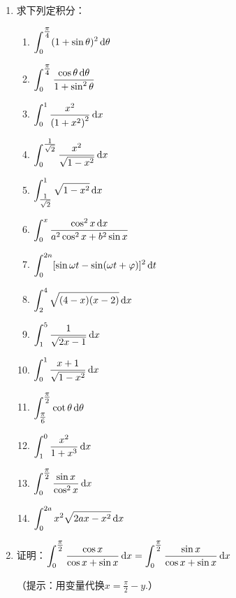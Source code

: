 \begin{ex}
\begin{enumerate}
    \item 求下列定积分：
\begin{multicols}{2}
\begin{enumerate}
    \item $\displaystyle\int_{0}^{\tfrac{\pi}{4}}(1+\sin \theta)^{2} \,{\rm d} \theta $ 
    \item $\displaystyle\int_{0}^{\tfrac{\pi}{4}} \dfrac{\cos \theta \,{\rm d} \theta}{1+\sin ^{2} \theta}$
    \item $\displaystyle\int_{0}^{1} \dfrac{x^{2}}{\left(1+x^{2}\right)^{2}} \,{\rm d} x$
    \item $\displaystyle\int_{0}^{\tfrac{1}{\sqrt{2}}} \dfrac{x^{2}}{\sqrt{1-x^{2}}} \,{\rm d} x$
    \item $\displaystyle\int_{\tfrac{1}{\sqrt{2}}}^{1} \sqrt{1-x^{2}} \,{\rm d} x$
    \item $\displaystyle\int_{0}^{x} \dfrac{\cos ^{2} x \,{\rm d} x}{a^{2} \cos ^{2} x+b^{2} \sin x}$
    \item $\displaystyle\int_{0}^{2 n}[\sin \omega t -\sin (\omega t+\varphi)]^{2} \,{\rm d} t$
    \item $\displaystyle\int_{2}^{4} \sqrt{(4-x)(x-2)} \,{\rm d} x$
    \item $\displaystyle\int_{1}^{5} \dfrac{1}{\sqrt{2 x-1}} \,{\rm d} x$ 
    \item $\displaystyle\int_{0}^{1} \dfrac{x+1}{\sqrt{1 - x^{2}}} \,{\rm d} x$
    \item $\displaystyle\int_{\tfrac{\pi}{6}}^{\tfrac{\pi}{2}} \cot \theta \,{\rm d} \theta$
    \item $\displaystyle\int_{1}^{0} \dfrac{x^{2}}{ 1+x^{3}} \,{\rm d} x$
    \item $\displaystyle\int^{\tfrac{\pi}{2}}_0 \dfrac{\sin x}{\cos^2 x}\,{\rm d} x$
    \item $\displaystyle\int^{2a}_0 x^2\sqrt{2ax-x^2}\,{\rm d} x$
\end{enumerate}
\end{multicols}

\item 证明：$\displaystyle\int^{\tfrac{\pi}{2}}_0 \dfrac{\cos x}{\cos x+\sin x}\,{\rm d} x=\displaystyle\int^{\tfrac{\pi}{2}}_0 \dfrac{\sin x}{\cos x+\sin x}\,{\rm d} x$

（提示：用变量代换$x=\frac{\pi}{2}-y$.）


\end{enumerate} 
\end{ex}


\begin{example}
    
\end{example}

\begin{solution}
    
\end{solution}


